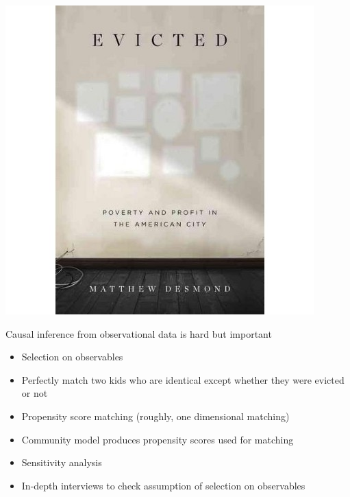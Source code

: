 \documentclass{beamer}
\begin{document}
\begin{frame}

\begin{center}
\includegraphics[height = .9\textheight]{figures/desmond_evicted_2016_cover}
\end{center}

\end{frame}
\begin{frame}

Causal inference from observational data is hard but important
\pause
\begin{itemize}
\item Selection on observables
\pause
\item Perfectly match two kids who are identical except whether they were evicted or not
\pause
\item Propensity score matching (roughly, one dimensional matching)
\pause
\item Community model produces propensity scores used for matching
\pause
\item Sensitivity analysis
\pause
\item In-depth interviews to check assumption of selection on observables
\end{itemize}

\end{frame}
\end{document}
